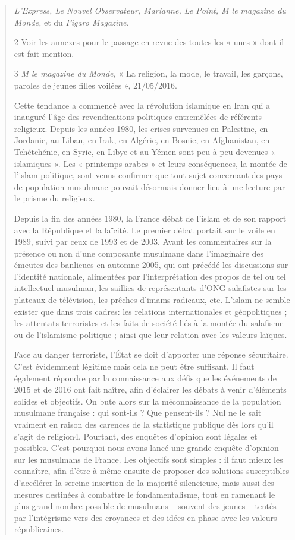 \begin{quote}
\emph{L'Express, Le Nouvel Observateur, Marianne, Le Point, M le
magazine du Monde,} et du \emph{Figaro Magazine.}

2 Voir les annexes pour le passage en revue des toutes les « unes » dont
il est fait mention.

3 \emph{M le magazine du Monde,} « La religion, la mode, le travail, les
garçons, paroles de jeunes filles voilées », 21/05/2016.



Cette tendance a commencé avec la révolution islamique en Iran qui a
inauguré l'âge des revendications politiques entremêlées de référents
religieux. Depuis les années 1980, les crises survenues en Palestine, en
Jordanie, au Liban, en Irak, en Algérie, en Bosnie, en Afghanistan, en
Tchétchénie, en Syrie, en Libye et au Yémen sont peu à peu devenues «
islamiques ». Les « printemps arabes » et leurs conséquences, la montée
de l'islam politique, sont venus confirmer que tout sujet concernant des
pays de population musulmane pouvait désormais donner lieu à une lecture
par le prisme du religieux.

Depuis la fin des années 1980, la France débat de l'islam et de son
rapport avec la République et la laïcité. Le premier débat portait sur
le voile en 1989, suivi par ceux de 1993 et de 2003. Avant les
commentaires sur la présence ou non d'une composante musulmane dans
l'imaginaire des émeutes des banlieues en automne 2005, qui ont précédé
les discussions sur l'identité nationale, alimentées par
l'interprétation des propos de tel ou tel intellectuel musulman, les
saillies de représentants d'ONG salafistes sur les plateaux de
télévision, les prêches d'imams radicaux, etc. L'islam ne semble exister
que dans trois cadres: les relations internationales et géopolitiques ;
les attentats terroristes et les faits de société liés à la montée du
salafisme ou de l'islamisme politique ; ainsi que leur relation avec les
valeurs laïques.

Face au danger terroriste, l'État se doit d'apporter une réponse
sécuritaire. C'est évidemment légitime mais cela ne peut être suffisant.
Il faut également répondre par la connaissance aux défis que les
événements de 2015 et de 2016 ont fait naître, afin d'éclairer les
débats à venir d'éléments solides et objectifs. On bute alors sur la
méconnaissance de la population musulmane française : qui sont-ils ? Que
pensent-ils ? Nul ne le sait vraiment en raison des carences de la
statistique publique dès lors qu'il s'agit de religion4. Pourtant, des
enquêtes d'opinion sont légales et possibles. C'est pourquoi nous avons
lancé une grande enquête d'opinion sur les musulmans de France. Les
objectifs sont simples : il faut mieux les connaître, afin d'être à même
ensuite de proposer des solutions susceptibles d'accélérer la sereine
insertion de la majorité silencieuse, mais aussi des mesures destinées à
combattre le fondamentalisme, tout en ramenant le plus grand nombre
possible de musulmans -- souvent des jeunes -- tentés par l'intégrisme
vers des croyances et des idées en phase avec les valeurs républicaines.


\end{quote}
